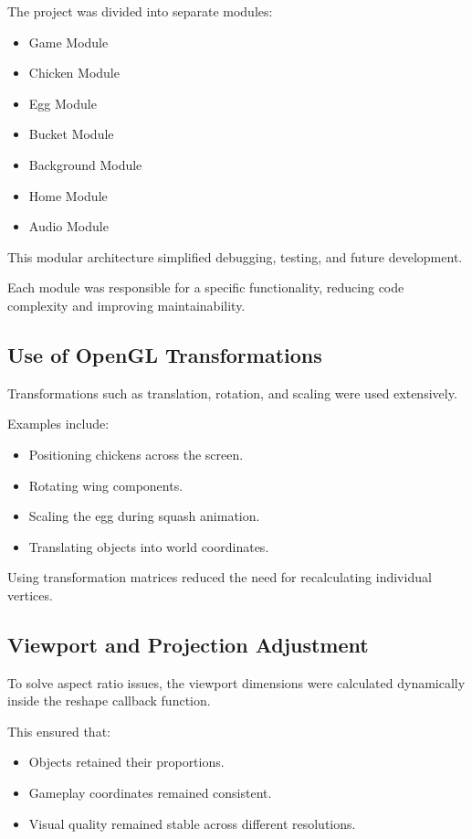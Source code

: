 \documentclass[12pt,a4paper]{report}
\begin{document}
The project was divided into separate modules:

\begin{itemize}
\item Game Module
\item Chicken Module
\item Egg Module
\item Bucket Module
\item Background Module
\item Home Module
\item Audio Module
\end{itemize}

This modular architecture simplified debugging, testing, and future development.

Each module was responsible for a specific functionality, reducing code complexity and improving maintainability.

\subsection*{Use of OpenGL Transformations}

Transformations such as translation, rotation, and scaling were used extensively.

Examples include:

\begin{itemize}
\item Positioning chickens across the screen.
\item Rotating wing components.
\item Scaling the egg during squash animation.
\item Translating objects into world coordinates.
\end{itemize}

Using transformation matrices reduced the need for recalculating individual vertices.

\subsection*{Viewport and Projection Adjustment}

To solve aspect ratio issues, the viewport dimensions were calculated dynamically inside the reshape callback function.

This ensured that:

\begin{itemize}
\item Objects retained their proportions.
\item Gameplay coordinates remained consistent.
\item Visual quality remained stable across different resolutions.
\end{itemize}
\end{document}
